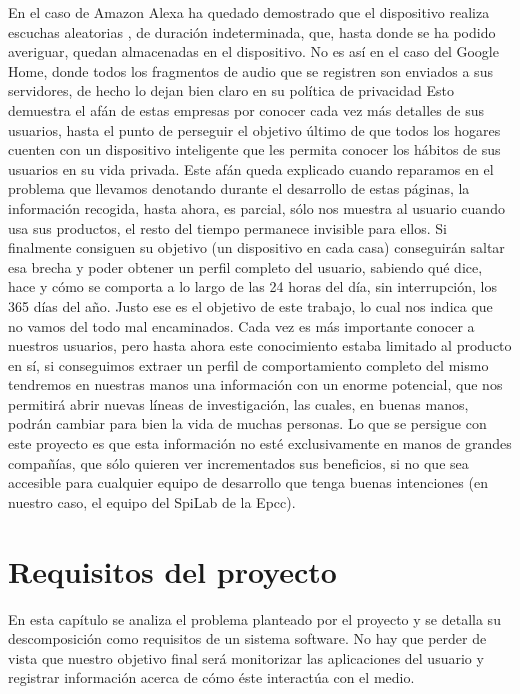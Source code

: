 \documentclass[12pt,a4paper,oneside]{book} %
\begin{document}
\newline
En el caso de Amazon Alexa ha quedado demostrado que el dispositivo realiza escuchas aleatorias \cite{alexaSpy}, de duración indeterminada, que, hasta donde se ha podido averiguar, quedan almacenadas en el dispositivo. No es así en el caso del Google Home, donde todos los fragmentos de audio que se registren son enviados a sus servidores, de hecho lo dejan bien claro en su política de privacidad \cite{GooglePrivacy}
\newline
\newline
Esto demuestra el afán de estas empresas por conocer cada vez más detalles de sus usuarios, hasta el punto de perseguir el objetivo último de que todos los hogares cuenten con un dispositivo inteligente que les permita conocer los hábitos de sus usuarios en su vida privada. 
\newline
\newline
Este afán queda explicado cuando reparamos en el problema que llevamos denotando durante el desarrollo de estas páginas, la información recogida, hasta ahora, es parcial, sólo nos muestra al usuario cuando usa sus productos, el resto del tiempo permanece invisible para ellos. Si finalmente consiguen su objetivo (un dispositivo en cada casa) conseguirán saltar esa brecha y poder obtener un perfil completo del usuario, sabiendo qué dice, hace y cómo se comporta a lo largo de las 24 horas del día, sin interrupción, los 365 días del año. 
\newline
\newline
Justo ese es el objetivo de este trabajo, lo cual nos indica que no vamos del todo mal encaminados. Cada vez es más importante conocer a nuestros usuarios, pero hasta ahora este conocimiento estaba limitado al producto en sí, si conseguimos extraer un perfil de comportamiento completo del mismo tendremos en nuestras manos una información con un enorme potencial, que nos permitirá abrir nuevas líneas de investigación, las cuales, en buenas manos, podrán cambiar para bien la vida de muchas personas. 
\newline
\newline
Lo que se persigue con este proyecto es que esta información no esté exclusivamente en manos de grandes compañías, que sólo quieren ver incrementados sus beneficios, si no que sea accesible para cualquier equipo de desarrollo que tenga buenas intenciones (en nuestro caso, el equipo del SpiLab de la Epcc). 
\newpage
\chapter{Requisitos del proyecto}
En esta capítulo se analiza el problema planteado por el proyecto y se detalla su descomposición como requisitos de un sistema software. No hay que perder de vista que nuestro objetivo final será monitorizar las aplicaciones del usuario y registrar información acerca de cómo éste interactúa con el medio.
\end{document}
